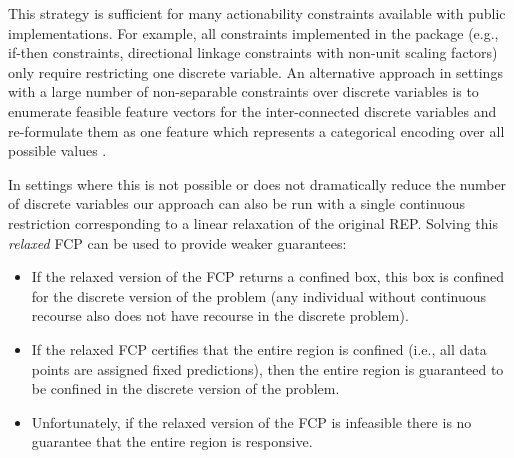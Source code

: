 This strategy is sufficient for many actionability constraints available with public implementations. For example, all constraints implemented in the  package \cite{kothari2023prediction} (e.g., if-then constraints, directional linkage constraints with non-unit scaling factors) only require restricting one discrete variable. An alternative approach in settings with a large number of non-separable constraints over discrete variables is to enumerate feasible feature vectors for the inter-connected discrete variables and re-formulate them as one feature which represents a categorical encoding over all possible values \citep[similar to the approach detailed in ][]{ustun2019actionable}. 

In settings where this is not possible or does not dramatically reduce the number of discrete variables our approach can also be run with a single continuous restriction corresponding to a linear relaxation of the original REP. Solving this \emph{relaxed} FCP can be used to provide weaker guarantees:
\begin{itemize}
    \item If the relaxed version of the FCP returns a confined box, this box is confined for the discrete version of the problem (any individual without continuous recourse also does not have recourse in the discrete problem).
    \item If the relaxed FCP certifies that the entire region is confined (i.e., all data points are assigned fixed predictions), then the entire region is guaranteed to be confined in the discrete version of the problem.
    \item Unfortunately, if the relaxed version of the FCP is infeasible there is no guarantee that the entire region is responsive. 
\end{itemize}
